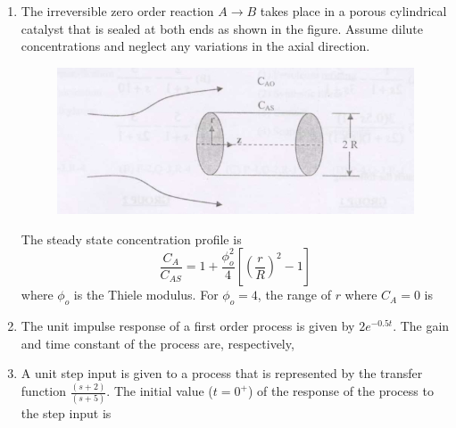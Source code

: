 \documentclass[journal,12pt,onecolumn]{IEEEtran}
\theoremstyle{remark}
\begin{document}
\begin{enumerate}
\item The irreversible zero order reaction $A \rightarrow B$ takes place in a porous cylindrical catalyst that is sealed at both ends as shown in the figure. Assume dilute concentrations and neglect any variations in the axial direction.
\begin{figure}[H]
    \centering
    \includegraphics[width=0.25\columnwidth]{figs/qn59.jpg}
    \caption{}
    \label{fig:qn.59.jpg}
\end{figure}
The steady state concentration profile is
\[\frac{C_A}{C_{AS}} = 1 + \frac{\phi_o^2}{4} \left[ \left( \frac{r}{R} \right)^2 - 1 \right]\]
where $\phi_o$ is the Thiele modulus. For $\phi_o = 4$, the range of $r$ where $C_A=0$ is
\hfill{}
\begin{enumerate}
\end{enumerate}

\item The unit impulse response of a first order process is given by $2 e^{-0.5 t}$. The gain and time constant of the process are, respectively,
\hfill{}
\begin{enumerate}
\end{enumerate}

\item A unit step input is given to a process that is represented by the transfer function $\frac{(s+2)}{(s+5)}$. The initial value ($t = 0^+$) of the response of the process to the step input is
\hfill{}
\begin{enumerate}
\end{enumerate}


\end{enumerate}
\end{document}
